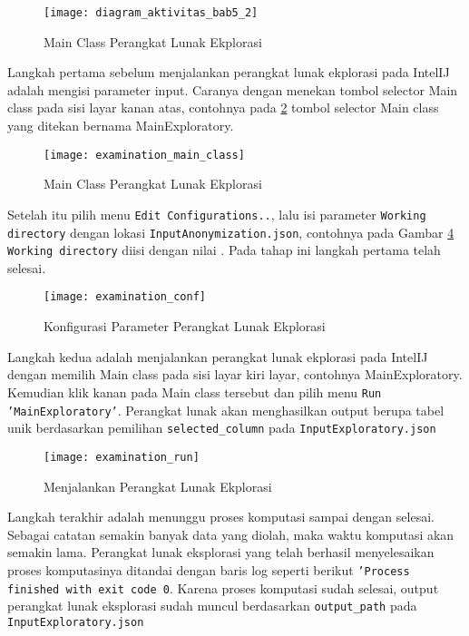 \begin{figure}[H]
	\centering
	\texttt{[image: diagram\_aktivitas\_bab5\_2]}
	\caption{Main Class Perangkat Lunak Ekplorasi}
	\label{fig:pertama1}
\end{figure}

Langkah pertama sebelum menjalankan perangkat lunak ekplorasi pada IntelIJ adalah mengisi parameter input. Caranya dengan menekan tombol selector Main class pada sisi layar kanan atas, contohnya pada \ref{fig:pertama1} tombol selector Main class yang ditekan bernama MainExploratory. 

\begin{figure}[H]
	\centering
	\texttt{[image: examination\_main\_class]}
	\caption{Main Class Perangkat Lunak Ekplorasi}
	\label{fig:pertama1}
\end{figure}

Setelah itu pilih menu \texttt{Edit Configurations..}, lalu isi parameter \texttt{Working directory} dengan lokasi \texttt{InputAnonymization.json}, contohnya pada Gambar \ref{fig:pertama2} \texttt{Working directory} diisi dengan nilai . Pada tahap ini langkah pertama telah selesai.

\begin{figure}[H]
	\centering
	\texttt{[image: examination\_conf]}
	\caption{Konfigurasi Parameter Perangkat Lunak Ekplorasi}
	\label{fig:pertama2}
\end{figure}

Langkah kedua adalah menjalankan perangkat lunak ekplorasi pada IntelIJ dengan memilih Main class pada sisi layar kiri layar, contohnya MainExploratory. Kemudian klik kanan pada Main class tersebut dan pilih menu \texttt{Run 'MainExploratory'}. Perangkat lunak akan menghasilkan output berupa tabel unik berdasarkan pemilihan \texttt{selected\_column} pada \texttt{InputExploratory.json}

\begin{figure}[H]
	\centering
	\texttt{[image: examination\_run]}
	\caption{Menjalankan Perangkat Lunak Ekplorasi}
	\label{fig:pertama2}
\end{figure}

Langkah terakhir adalah menunggu proses komputasi sampai dengan selesai. Sebagai catatan semakin banyak data yang diolah, maka waktu komputasi akan semakin lama. Perangkat lunak eksplorasi yang telah berhasil menyelesaikan proses komputasinya ditandai dengan baris log seperti berikut \texttt{'Process finished with exit code 0}. Karena proses komputasi sudah selesai, output perangkat lunak eksplorasi sudah muncul berdasarkan \texttt{output\_path} pada \texttt{InputExploratory.json}

